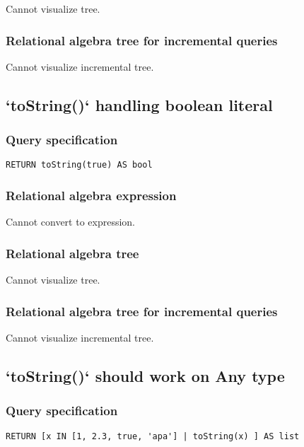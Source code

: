 Cannot visualize tree.

\subsubsection*{Relational algebra tree for incremental queries}

Cannot visualize incremental tree.

\subsection{`toString()` handling boolean literal}

\subsubsection*{Query specification}

\begin{lstlisting}
RETURN toString(true) AS bool
\end{lstlisting}

\subsubsection*{Relational algebra expression}

Cannot convert to expression.

\subsubsection*{Relational algebra tree}

Cannot visualize tree.

\subsubsection*{Relational algebra tree for incremental queries}

Cannot visualize incremental tree.

\subsection{`toString()` should work on Any type}

\subsubsection*{Query specification}

\begin{lstlisting}
RETURN [x IN [1, 2.3, true, 'apa'] | toString(x) ] AS list
\end{lstlisting}

